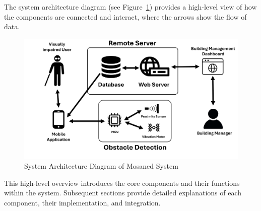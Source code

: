 The system architecture diagram (see Figure~\ref{fig:system_architecture}) provides a high-level view of how the components are connected and interact, where the arrows show the flow of data. 

\begin{figure}[h]
	\centering
	\includegraphics[width=1\linewidth]{assets/ch2/sys_arch}
	\caption{System Architecture Diagram of Mosaned System}
	\label{fig:system_architecture}
\end{figure}

This high-level overview introduces the core components and their functions within the system. Subsequent sections provide detailed explanations of each component, their implementation, and integration.
